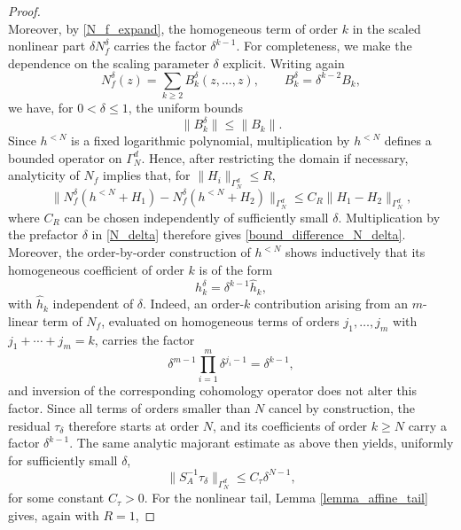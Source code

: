 \documentclass[10pt,a4paper]{amsart}
\begin{document}
\begin{proof}
\begin{equation}
\end{equation}
Moreover, by \eqref{N_f_expand}, the homogeneous term of order
$k$ in the scaled nonlinear part $\delta N_f^\delta$ carries the
factor $\delta^{k-1}$. For completeness, we make the dependence on the scaling parameter $\delta$ explicit. Writing again
\begin{equation}
N_f^\delta(z)
=
\sum_{k\geq 2} B_k^\delta(z,\ldots,z),
\qquad
B_k^\delta=\delta^{k-2}B_k,
\end{equation}
we have, for $0<\delta\leq 1$, the uniform bounds
\begin{equation}
\|B_k^\delta\|\leq \|B_k\|.
\end{equation}
Since $h^{<N}$ is a fixed logarithmic polynomial, multiplication by
$h^{<N}$ defines a bounded operator on $\Gamma_N^d$. Hence, after
restricting the domain if necessary, analyticity of $N_f$ implies that,
for $\|H_i\|_{\Gamma_N^d}\leq R$,
\begin{equation}
\bigl\|
N_f^\delta(h^{<N}+H_1)
-
N_f^\delta(h^{<N}+H_2)
\bigr\|_{\Gamma_N^d}
\leq
C_R\|H_1-H_2\|_{\Gamma_N^d},
\end{equation}
where $C_R$ can be chosen independently of sufficiently small $\delta$.
Multiplication by the prefactor $\delta$ in \eqref{N_delta} therefore gives
\eqref{bound_difference_N_delta}. Moreover, the order-by-order construction of $h^{<N}$ shows inductively that its homogeneous coefficient of order $k$ is of
the form
\begin{equation}
h_k^\delta=\delta^{k-1}\widehat h_k,
\end{equation}
with $\widehat h_k$ independent of $\delta$. Indeed, an order-$k$
contribution arising from an $m$-linear term of $N_f$, evaluated on
homogeneous terms of orders $j_1,\ldots,j_m$ with
$j_1+\cdots+j_m=k$, carries the factor
\begin{equation}
\delta^{m-1}\prod_{i=1}^m\delta^{j_i-1}
=
\delta^{k-1},
\end{equation}
and inversion of the corresponding cohomology operator does not alter
this factor. Since all terms of orders smaller than $N$ cancel by
construction, the residual $\tau_\delta$ therefore starts at order $N$,
and its coefficients of order $k\geq N$ carry a factor $\delta^{k-1}$. The same analytic majorant estimate as above then yields, uniformly for sufficiently small $\delta$,
\begin{equation}\label{bound_residual_revised}
\|S_A^{-1}\tau_\delta\|_{\Gamma_N^d}
\leq
C_\tau\delta^{N-1},
\end{equation}
for some constant $C_\tau>0$. For the nonlinear tail, Lemma \ref{lemma_affine_tail} gives, again with $R=1$,

\end{proof}
\end{document}
